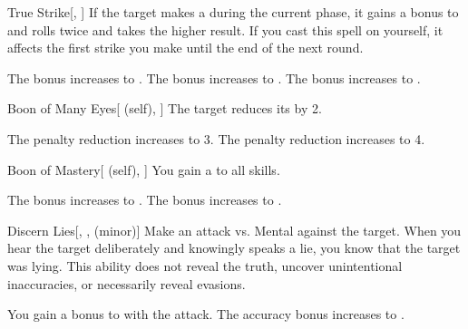 \lowercase{\hypertarget{spell:True Strike}{}}\label{spell:True Strike}
\begin{freeability}[Rank 1]{\hypertarget{spell:True Strike}{True Strike}}[, ]
If the target makes a  during the current phase,
it gains a  bonus to  and rolls twice and takes the higher result.
If you cast this spell on yourself, it affects the first strike you make until the end of the next round.

\rankline
{} The bonus increases to .
 The bonus increases to .
 The bonus increases to .
\end{freeability}
\vspace{0.25em}



\lowercase{\hypertarget{spell:Boon of Many Eyes}{}}\label{spell:Boon of Many Eyes}
\begin{attuneability}[Rank 3]{\hypertarget{spell:Boon of Many Eyes}{Boon of Many Eyes}}[ (self), ]
The target reduces its  by 2.

\rankline
{} The penalty reduction increases to 3.
 The penalty reduction increases to 4.
\end{attuneability}
\vspace{0.25em}



\lowercase{\hypertarget{spell:Boon of Mastery}{}}\label{spell:Boon of Mastery}
\begin{attuneability}[Rank 3]{\hypertarget{spell:Boon of Mastery}{Boon of Mastery}}[ (self), ]
You gain a   to all skills.

\rankline
{} The bonus increases to .
 The bonus increases to .
\end{attuneability}
\vspace{0.25em}



\lowercase{\hypertarget{spell:Discern Lies}{}}\label{spell:Discern Lies}
\begin{freeability}[Rank 3]{\hypertarget{spell:Discern Lies}{Discern Lies}}[, ,  (minor)]
Make an attack vs. Mental against the target.
\hit When you hear the target deliberately and knowingly speaks a lie, you know that the target was lying.
This ability does not reveal the truth, uncover unintentional inaccuracies, or necessarily reveal evasions.

\rankline
{} You gain a  bonus to  with the attack.
 The accuracy bonus increases to .
\end{freeability}
\vspace{0.25em}



